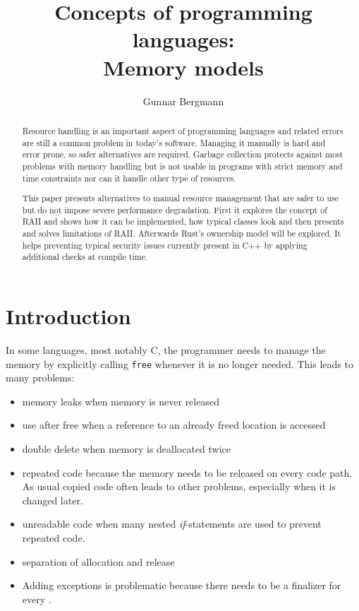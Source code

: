 \documentclass[conference,twocolumn]{IEEEtran}
\begin{document}
    

\title{Concepts of programming languages: \\ Memory models}
\author{Gunnar Bergmann}


\maketitle

\begin{abstract}
Resource handling is an important aspect of programming languages and related errors are still a common problem in today's software. Managing it manually is hard and error prone, so safer alternatives are required. Garbage collection protects against most problems with memory handling but is not usable in programs with strict memory and time constraints nor can it handle other type of resources.

This paper presents alternatives to manual resource management that are safer to use but do not impose severe performance degradation. First it explores the concept of RAII and shows how it can be implemented, how typical classes look and then presents and solves limitations of RAII. Afterwards Rust's ownership model will be explored. It helps preventing typical security issues currently present in C++ by applying additional checks at compile time.

\end{abstract}


\section{Introduction}

In some languages, most notably C, the programmer needs to manage the memory by explicitly calling \verb|free| whenever it is no longer needed.
This leads to many problems:
\begin{itemize}
    \item memory leaks when memory is never released
    \item use after free when a reference to an already freed location is accessed
    \item double delete when memory is deallocated twice
    \item repeated code because the memory needs to be released on every code path. As usual copied code often leads to other problems, especially when it is changed later.
    \item unreadable code when many nested \emph{if}-statements are used to prevent repeated code.
    \item separation of allocation and release
    \item Adding exceptions is problematic because there needs to be a finalizer for every .
\end{itemize}
\end{document}
